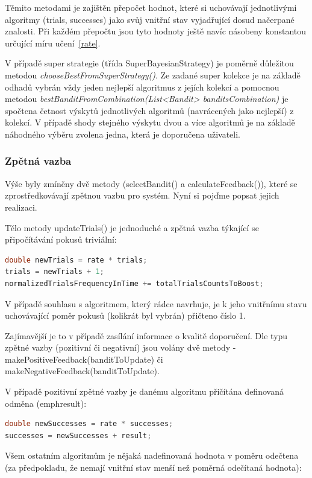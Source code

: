 \documentclass[thesis=M,czech]{FITthesis}[2014/05/07]
\begin{document}
Těmito metodami je zajištěn přepočet hodnot, které si uchovávají jednotlivými algoritmy (trials, successes) jako svůj vnitřní stav vyjadřující dosud načerpané znalosti. Při každém přepočtu jsou tyto hodnoty ještě navíc násobeny konstantou určující míru učení~\ref{rate}.
    
V případě super strategie (třída SuperBayesianStrategy) je poměrně důležitou metodou \emph{chooseBestFromSuperStrategy()}. Ze zadané super kolekce je na základě odhadů vybrán vždy jeden nejlepší algoritmus z jejích kolekcí a pomocnou metodou \emph{bestBanditFromCombination(List<Bandit> banditsCombination)} je spočtena četnost výskytů jednotlivých algoritmů (navrácených jako nejlepší) z kolekcí. V případě shody stejného výskytu dvou a více algoritmů je na základě náhodného výběru zvolena jedna, která je doporučena uživateli.
    
\subsubsection{Zpětná vazba}
\label{implfeedback}     
Výše byly zmíněny dvě metody (selectBandit() a calculateFeedback()), které se zprostředkovávají zpětnou vazbu pro systém. Nyní si pojďme popsat jejich realizaci.

Tělo metody updateTrials() je jednoduché a zpětná vazba týkající se připočítávání pokusů triviální:

\begin{lstlisting}[language=java]
double newTrials = rate * trials;
trials = newTrials + 1;
normalizedTrialsFrequencyInTime += totalTrialsCountsToBoost;
\end{lstlisting}	

V případě souhlasu s algoritmem, který rádce navrhuje, je k jeho vnitřnímu stavu uchovávající poměr pokusů (kolikrát byl vybrán) přičteno číslo 1.

Zajímavější je to v případě zasílání informace o kvalitě doporučení. Dle typu zpětné vazby (pozitivní či negativní) jsou volány dvě metody - makePositiveFeedback(banditToUpdate) či makeNegativeFeedback(banditToUpdate).

V případě pozitivní zpětné vazby je danému algoritmu přičítána definovaná odměna (emph{result}):

\begin{lstlisting}[language=java]
double newSuccesses = rate * successes;
successes = newSuccesses + result;
\end{lstlisting}	

Všem ostatním algoritmům je nějaká nadefinovaná hodnota v poměru odečtena (za předpokladu, že nemají vnitřní stav menší než poměrná odečítaná hodnota):
\end{document}
